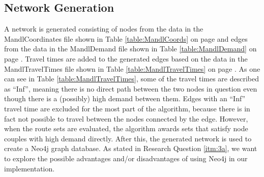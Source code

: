 \subsection{Network Generation}
A network is generated consisting of nodes from the data in the MandlCoordinates file shown in Table \ref{table:MandlCoords} on page \pageref{table:MandlCoords} and edges from the data in the MandlDemand file shown in Table \ref{table:MandlDemand} on page \pageref{table:MandlDemand}. Travel times are added to the generated edges based on the data in the MandlTravelTimes file shown in Table \ref{table:MandlTravelTimes} on page \pageref{table:MandlTravelTimes}. As one can see in Table \ref{table:MandlTravelTimes}, some of the travel times are described as ``Inf'', meaning there is no direct path between the two nodes in question even though there is a (possibly) high demand between them. Edges with an ``Inf'' travel time are excluded for the most part of the algorithm, because there is in fact not possible to travel between the nodes connected by the edge. However, when the route sets are evaluated, the algorithm awards sets that satisfy node couples with high demand directly. After this, the generated network is used to create a Neo4j graph database. As stated in Research Question \ref{itm:3a}, we want to explore the possible advantages and/or disadvantages of using Neo4j in our implementation.
